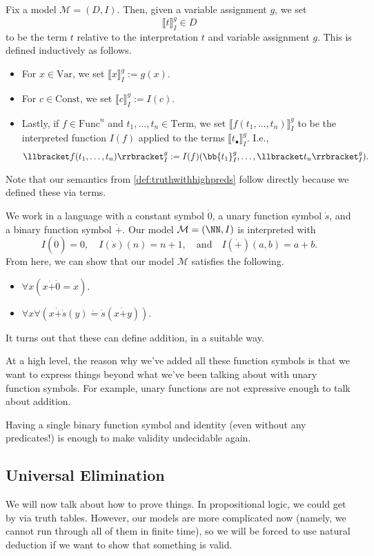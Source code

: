 \documentclass[../notes.tex]{subfiles}
\begin{document}
\begin{defi}[Denotation]
	Fix a model $\mathcal M=(D,I)$. Then, given a variable assignment $g$, we set
	\[\llbracket t\rrbracket_I^g\in D\]
	to be the term $t$ relative to the interpretation $t$ and variable assignment $g$. This is defined inductively as follows.
	\begin{itemize}
		\item For $x\in\mathrm{Var}$, we set $\llbracket x\rrbracket_I^g:=g(x)$.
		\item For $c\in\mathrm{Const}$, we set $\llbracket c\rrbracket_I^g:=I(c)$.
		\item Lastly, if $f\in\mathrm{Func}^n$ and $t_1,\ldots,t_n\in\mathrm{Term}$, we set $\llbracket f(t_1,\ldots,t_n)\rrbracket_I^g$ to be the interpreted function $I(f)$ applied to the terms $\llbracket t_\bullet\rrbracket_I^g$. I.e.,
		\[\llbracket f(t_1,\ldots,t_n)\rrbracket_I^g:=I(f)(\bb{t_1}_I^g,\ldots,\llbracket t_n\rrbracket_I^g).\]
	\end{itemize}
\end{defi}
Note that our semantics from \autoref{def:truthwithhighpreds} follow directly because we defined these via terms.
\begin{example}
	We work in a language with a constant symbol $\dot0$, a unary function symbol $\dot s$, and a binary function symbol $\dot+$. Our model $\mathcal M=(\NN,I)$ is interpreted with
	\[I(\dot0)=0,\quad I(\dot s)(n)=n+1,\quad\text{and}\quad I(\dot+)(a,b)=a+b.\]
	From here, we can show that our model $\mathcal M$ satisfies the following.
	\begin{itemize}
		\item $\forall x(x\dot+\dot0=x)$.
		\item $\forall x\forall(x\dot+\dot s(y)\dot=\dot s(x\dot+y))$.
	\end{itemize}
	It turns out that these can define addition, in a suitable way.
\end{example}
At a high level, the reason why we've added all these function symbols is that we want to express things beyond what we've been talking about with unary function symbols. For example, unary functions are not expressive enough to talk about addition.
\begin{remark}
	Having a single binary function symbol and identity (even without any predicates!) is enough to make validity undecidable again.
\end{remark}

\subsection{Universal Elimination}
We will now talk about how to prove things. In propositional logic, we could get by via truth tables. However, our models are more complicated now (namely, we cannot run through all of them in finite time), so we will be forced to use natural deduction if we want to show that something is valid.
\end{document}
